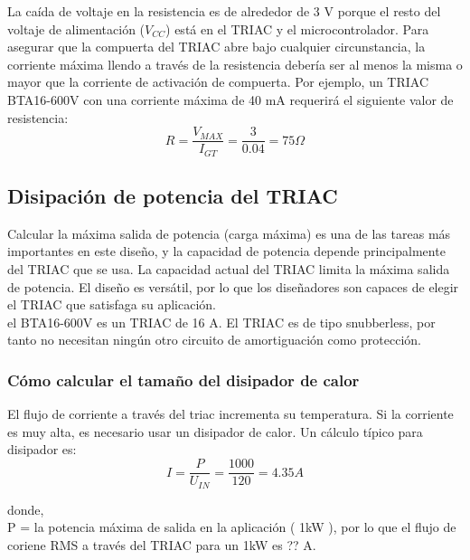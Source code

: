     La caída de voltaje en la resistencia es de alrededor de 3 V porque el resto del voltaje de alimentación ($V_{CC}$) está en el TRIAC y el microcontrolador. Para asegurar que la compuerta del TRIAC abre bajo cualquier circunstancia, la corriente máxima llendo a través de la resistencia debería ser al menos la misma o mayor que la corriente de activación de compuerta. Por ejemplo, un TRIAC BTA16-600V con una corriente máxima de 40 mA requerirá el siguiente valor de resistencia:\\

    \begin{equation}
        R = \frac{ V_{MAX} }{ I_{GT} }  =    \frac{3}{0.04} =   75\Omega
    \end{equation}
    
\subsection{Disipación de potencia del TRIAC}
    Calcular la máxima salida de potencia (carga máxima) es una de las tareas más importantes en este diseño, y la capacidad de potencia depende principalmente del TRIAC que se usa. La capacidad actual del TRIAC limita la máxima salida de potencia. El diseño es versátil, por lo que los diseñadores son capaces de elegir el TRIAC que satisfaga su aplicación.\\
    
    el BTA16-600V es un TRIAC de 16 A. El TRIAC es de tipo snubberless, por tanto no necesitan ningún otro circuito de amortiguación como protección. 
    
        \subsubsection*{Cómo calcular el tamaño del disipador de calor}
            El flujo de corriente a través del triac incrementa su temperatura. Si la corriente es muy alta, es necesario usar un disipador de calor. Un cálculo típico para disipador es:\\
            
            \begin{equation}
                I   =   \frac{P}{ U_{IN} }  =   \frac{1000}{120}    =   4.35 A
            \end{equation}
        
            donde,\\
            P = la potencia máxima de salida en la aplicación ( 1kW ), por lo que el flujo de coriene RMS a través del TRIAC para un 1kW es ?? A.
        
